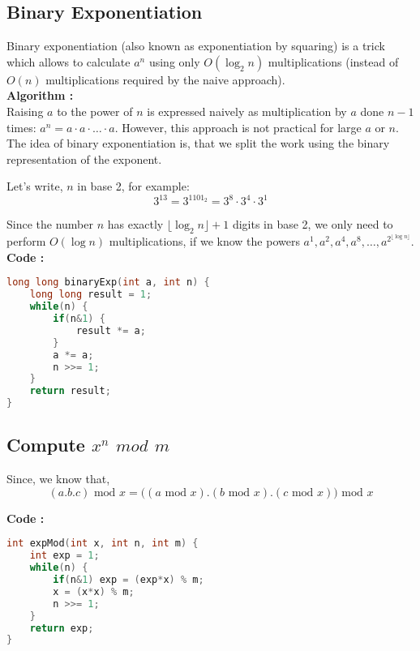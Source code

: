 \subsection{Binary Exponentiation}
Binary exponentiation (also known as exponentiation by squaring) is a trick which allows to calculate $a^n$ using only $O(\log_2{n})$ multiplications (instead of $O(n)$ multiplications required by the naive approach).\\

\textbf{Algorithm :}\\
Raising $a$ to the power of $n$ is expressed naively as multiplication by $a$ done $n-1$ times: $a^{n} = a \cdot a \cdot \ldots \cdot a$. However, this approach is not practical for large $a$ or $n$.\\
The idea of binary exponentiation is, that we split the work using the binary representation of the exponent.

Let's write, $n$ in base 2, for example:\\
	$$3^{13} = 3^{1101_2} = 3^8 \cdot 3^4 \cdot 3^1$$

Since the number $n$ has exactly $\lfloor \log_2 n \rfloor + 1$ digits in base 2, we only need to perform $O(\log n)$ multiplications, if we know the powers $a^1, a^2, a^4, a^8, \dots, a^{2^{\lfloor \log n \rfloor}}$.\\

\textbf{Code :}
\begin{lstlisting}[language=c++]
long long binaryExp(int a, int n) {
    long long result = 1;
    while(n) {
        if(n&1) {
            result *= a;
        }
        a *= a;
        n >>= 1;
    }
    return result;
}
\end{lstlisting}

\subsection{Compute $x^n$ $mod$ $m$}
Since, we know that,
\begin{equation*}
	(a.b.c)\text{ mod }x = \big((a\text{ mod }x).(b\text{ mod }x).(c\text{ mod }x)\big)\text{ mod }x
\end{equation*}

\textbf{Code :}
\begin{lstlisting}[language=c++]
int expMod(int x, int n, int m) {
    int exp = 1;
    while(n) {
        if(n&1) exp = (exp*x) % m;
        x = (x*x) % m;
        n >>= 1;
    }
    return exp;
}
\end{lstlisting}
						  
